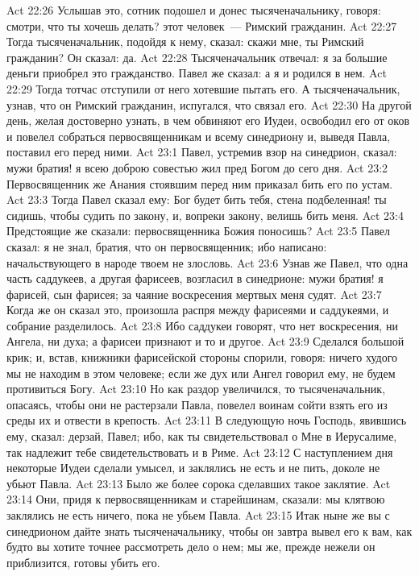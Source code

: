\vs Act 22:26 Услышав это, сотник подошел и донес тысяченачальнику, говоря: смотри, что ты хочешь делать? этот человек~--- Римский гражданин.
\vs Act 22:27 Тогда тысяченачальник, подойдя к нему, сказал: скажи мне, ты Римский гражданин? Он сказал: да.
\vs Act 22:28 Тысяченачальник отвечал: я за большие деньги приобрел это гражданство. Павел же сказал: а я и родился в нем.
\vs Act 22:29 Тогда тотчас отступили от него хотевшие пытать его. А тысяченачальник, узнав, что он Римский гражданин, испугался, что связал его.
\rsbpar\vs Act 22:30 На другой день, желая достоверно узнать, в чем обвиняют его Иудеи, освободил его от оков и повелел собраться первосвященникам и всему синедриону и, выведя Павла, поставил его перед ними.
\vs Act 23:1 Павел, устремив взор на синедрион, сказал: мужи братия! я всею доброю совестью жил пред Богом до сего дня.
\vs Act 23:2 Первосвященник же Анания стоявшим перед ним приказал бить его по устам.
\vs Act 23:3 Тогда Павел сказал ему: Бог будет бить тебя, стена подбеленная! ты сидишь, чтобы судить по закону, и, вопреки закону, велишь бить меня.
\vs Act 23:4 Предстоящие же сказали: первосвященника Божия поносишь?
\vs Act 23:5 Павел сказал: я не знал, братия, что он первосвященник; ибо написано: начальствующего в народе твоем не злословь.
\vs Act 23:6 Узнав же Павел, что  одна часть саддукеев, а другая фарисеев, возгласил в синедрионе: мужи братия! я фарисей, сын фарисея; за чаяние воскресения мертвых меня судят.
\vs Act 23:7 Когда же он сказал это, произошла распря между фарисеями и саддукеями, и собрание разделилось.
\vs Act 23:8 Ибо саддукеи говорят, что нет воскресения, ни Ангела, ни духа; а фарисеи признают и то и другое.
\vs Act 23:9 Сделался большой крик; и, встав, книжники фарисейской стороны спорили, говоря: ничего худого мы не находим в этом человеке; если же дух или Ангел говорил ему, не будем противиться Богу.
\vs Act 23:10 Но как раздор увеличился, то тысяченачальник, опасаясь, чтобы они не растерзали Павла, повелел воинам сойти взять его из среды их и отвести в крепость.
\rsbpar\vs Act 23:11 В следующую ночь Господь, явившись ему, сказал: дерзай, Павел; ибо, как ты свидетельствовал о Мне в Иерусалиме, так надлежит тебе свидетельствовать и в Риме.
\vs Act 23:12 С наступлением дня некоторые Иудеи сделали умысел, и заклялись не есть и не пить, доколе не убьют Павла.
\vs Act 23:13 Было же более сорока сделавших такое заклятие.
\vs Act 23:14 Они, придя к первосвященникам и старейшинам, сказали: мы клятвою заклялись не есть ничего, пока не убьем Павла.
\vs Act 23:15 Итак ныне же вы с синедрионом дайте знать тысяченачальнику, чтобы он завтра вывел его к вам, как будто вы хотите точнее рассмотреть дело о нем; мы же, прежде нежели он приблизится, готовы убить его.
